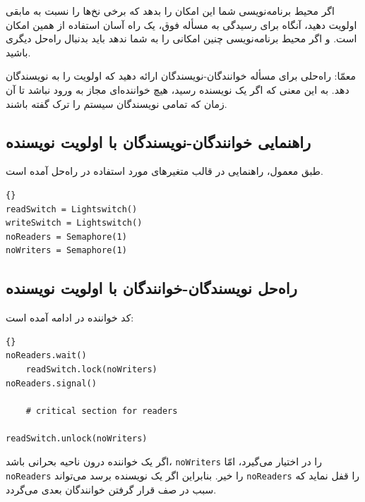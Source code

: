 \documentclass{book}
\newcommand{\clearemptydoublepage}{}%
\begin{document}
    اگر محیط برنامه‌نویسی شما این امکان را بدهد که برخی نخ‌ها را نسبت به مابقی اولویت دهید، آنگاه برای رسیدگی به مسأله فوق، یک راه آسان استفاده از همین امکان است. 
    و اگر محیط برنامه‌نویسی چنین امکانی را به شما ندهد باید بدنبال راه‌حل دیگری باشید. 

    معمّا: راه‌حلی برای مسأله خوانندگان-نویسندگان ارائه دهید که اولویت را به نویسندگان  دهد. به این معنی که اگر یک نویسنده رسید، هیچ خواننده‌ای  
    مجاز به ورود نباشد تا آن زمان که تمامی نویسندگان سیستم را ترک گفته باشند. 


\clearemptydoublepage
\subsection{راهنمایی خوانندگان-نویسندگان با اولویت نویسنده}

    طبق معمول،‌ راهنمایی در قالب متغیرهای مورد استفاده در راه‌حل آمده است. 

\begin{latin}
\begin{lstlisting}[title=\rl{مقداردهی اولیه خوانندگان-نویسندگان با اولویت نویسنده}]{}
readSwitch = Lightswitch()
writeSwitch = Lightswitch()
noReaders = Semaphore(1)
noWriters = Semaphore(1)
\end{lstlisting}
\end{latin}


\clearemptydoublepage
\subsection{راه‌حل نویسندگان-خوانندگان با اولویت نویسنده}


    کد خواننده در ادامه آمده است:

\begin{latin}
\begin{lstlisting}[title=\rl{راه‌حل خواننده با اولویت نویسنده}]{}
noReaders.wait()
    readSwitch.lock(noWriters)
noReaders.signal()

    # critical section for readers

readSwitch.unlock(noWriters)
\end{lstlisting}
\end{latin}

    اگر یک خواننده درون ناحیه بحرانی باشد، {\tt noWriters} را در اختیار می‌گیرد، امّا {\tt noReaders} را خیر. 
    بنابراین اگر یک نویسنده برسد می‌تواند {\tt noReaders} را قفل نماید که سبب در صف قرار گرفتن خوانندگان بعدی می‌گردد. 
\end{document}
